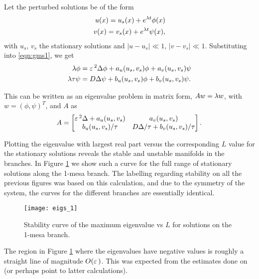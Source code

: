 Let the perturbed solutions be of the form
% 
\begin{equation}
\label{eqn:gms_eigs}
\begin{split}
\begin{aligned}
u(x) = u_s(x) + e^{\lambda t}\phi(x)\\
v(x) = v_s(x) + e^{\lambda t}\psi(x),
\end{aligned}
\end{split}
\end{equation}
% 
with $u_s$, $v_s$ the stationary solutions and $|u-u_s|\ll 1$, $|v-v_s|\ll 1$. Substituting into \eqref{eqn:gms1}, we get
% 
\begin{equation}
\label{eqn:gms_2}
\begin{split}
\begin{aligned}
	\lambda \phi &= \varepsilon\,^2\Delta \phi + a_u(u_s,v_s)\phi + a_v(u_s,v_s)\psi \\
	\lambda\tau \psi &= D\Delta \psi + b_u(u_s,v_s)\phi + b_v(u_s,v_s)\psi.
\end{aligned}
\end{split}
\end{equation}

This can be written as an eigenvalue problem in matrix form, $Aw = \lambda w$, with $w = (\phi,\psi)^T$, and $A$ as
% 
\begin{equation}
\label{eqn:Amatrix}
  A =
	\begin{bmatrix}
		\varepsilon\,^2\Delta + a_u(u_s,v_s)& a_v(u_s,v_s) \\
		b_u(u_s,v_s)/\tau& D\Delta/\tau + b_v(u_s,v_s)/\tau
  \end{bmatrix}.
\end{equation}

Plotting the eigenvalue with largest real part versus the corresponding $L$ value for the stationary solutions reveals the stable and unstable manifolds in the branches. In Figure \ref{fig:eigs1} we show such a curve for the full range of stationary solutions along the 1-mesa branch. The labelling regarding stability on all the previous figures was based on this calculation, and due to the symmetry of the system, the curves for the different branches are essentially identical.
% 
\begin{figure}[htb]
\begin{center}
\texttt{[image: eigs\_1]}
\caption{Stability curve of the maximum eigenvalue vs $L$ for solutions on the 1-mesa branch.}
\label{fig:eigs1}
\end{center}
\end{figure}
% 
The region in Figure \ref{fig:eigs1} where the eigenvalues have negative values is roughly a straight line of magnitude $O(\varepsilon\,)$. This was expected from the estimates done on \cite{kolokolnikov_spot_2009} (or perhaps point to latter calculations).

